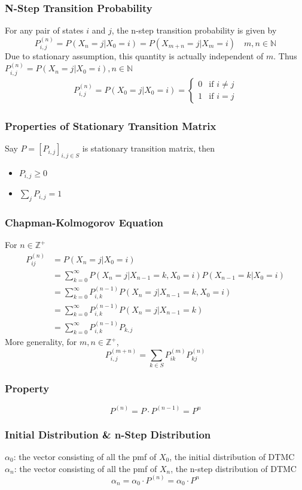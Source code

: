 \documentclass[11pt]{article}
\newcommand{\N}{{\mathbb{N}}}
\newcommand{\Z}{{\mathbb{Z}}}
\begin{document}
\subsubsection*{N-Step Transition Probability}
For any pair of states $i$ and $j$, the n-step transition probability is given by 
\[P_{i,j}^{(n)} = P(X_n = j | X_0 = i) = P(X_{m+n}=j|X_m=i)\quad m,n\in\N\]
Due to stationary assumption, this quantity is actually independent of $m$. Thus $P_{i,j}^{(n)} = P(X_n=j|X_0=i), n\in\N$ 
\begin{align*}
    P_{i,j}^{(n)} = P(X_0=j|X_0=i) = \begin{cases}
        0 & \text{if } i\neq j \\
        1 & \text{if } i=j
    \end{cases}
\end{align*} 
\subsubsection{Properties of Stationary Transition Matrix}
Say $P = [P_{i,j}]_{i,j\in S}$ is stationary transition matrix, then 
\begin{itemize}
    \item $P_{i,j}\geq 0$ 
    \item $\sum_j P_{i,j}=1$ 
\end{itemize}
\subsubsection{Chapman-Kolmogorov Equation}
For $n\in\Z^+$ 
\begin{align*}
    P_{ij}^{(n)} &= P(X_n=j|X_0=i) \\ 
                 &= \sum_{k=0}^\infty P(X_n=j|X_{n-1}=k,X_0=i) P(X_{n-1}=k|X_0=i) \\
                 &= \sum_{k=0}^{\infty} P_{i,k}^{(n-1)}P(X_n=j|X_{n-1}=k,X_0=i) \\
                 &= \sum_{k=0}^{\infty} P_{i,k}^{(n-1)}P(X_n=j|X_{n-1}=k) \\
                 &= \sum_{k=0}^{\infty} P_{i,k}^{(n-1)}P_{k,j}
\end{align*}
More generality, for $m,n\in\Z^+$,
\[P_{i,j}^{(m+n)} = \sum_{k\in S}P_{ik}^{(m)}P_{kj}^{(n)}\]
\subsubsection*{Property}
\[P^{(n)} = P\cdot P^{(n-1)} = P^n\]
\subsubsection{Initial Distribution \& n-Step Distribution}
$\alpha_0$: the vector consisting of all the pmf of $X_0$, the initial distribution of DTMC \\
$\alpha_n$: the vector consisting of all the pmf of $X_n$, the n-step distribution of DTMC 
\[\alpha_n = \alpha_0\cdot P^{(n)} = \alpha_0\cdot P^n\] 
\end{document}
